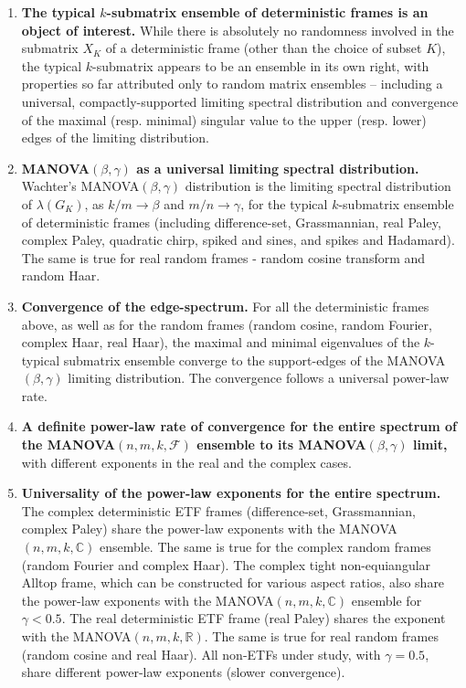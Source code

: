 \documentclass[a4paper,12pt]{article}
\newcommand{\TODO}[1]{ {\tt \color{red} [TODO:#1] } }
\newcommand{\R}{\ensuremath{\mathbb{R}}}
\newcommand{\C}{\ensuremath{\mathbb{C}}}
\newcommand{\Fc}{\ensuremath{\mathcal{F}}}
\newcommand{\m}{m}
\begin{document}
\begin{enumerate}
	\item {\bf The typical $k$-submatrix ensemble of deterministic frames is an
		object of interest.}
		While there is absolutely no randomness involved in the submatrix $X_K$
		of a deterministic frame (other than the choice of subset $K$), 
		the typical $k$-submatrix appears to be an ensemble in its own right,
		with properties so far attributed only to random matrix ensembles --
		including a universal, compactly-supported
		limiting spectral distribution and convergence of the maximal (resp.
		minimal) singular value to the upper (resp. lower) edges of the limiting
		distribution.

	\item {\bf MANOVA$(\beta,\gamma)$ as a universal limiting spectral distribution.}
		Wachter's MANOVA$(\beta,\gamma)$
		distribution is the limiting spectral distribution of $\lambda(G_K)$, as
		$k/m\to\beta$ and $m/n\to\gamma$, 
		for the typical $k$-submatrix ensemble of deterministic frames 
		(including difference-set, Grassmannian, real Paley, complex Paley,
		quadratic chirp, spiked and sines, and spikes and Hadamard).
		The same is true for real random frames - random cosine transform and
		random Haar.

	\item {\bf Convergence of the edge-spectrum.} 
		For all the deterministic frames above, as well as for the random frames 
		(random cosine, random Fourier, complex Haar, real Haar), the 
		maximal and minimal eigenvalues of the $k$-typical submatrix ensemble 
		converge to the support-edges of the MANOVA$(\beta,\gamma)$ limiting 
		distribution. The convergence follows a universal power-law rate.

	\item {\bf A definite power-law rate of convergence for the
			entire spectrum of the MANOVA$(n,m,k,\Fc)$ ensemble to its 
		MANOVA$(\beta,\gamma)$ limit,} with different exponents in the real and
		the complex cases.

	\item {\bf Universality of the power-law exponents for the entire
		spectrum.} The complex deterministic ETF frames 
		(difference-set, Grassmannian,
		complex Paley)  share the power-law exponents with the
		MANOVA$(n,\m,k,\C)$ ensemble. The same is true for
		the complex random frames (random Fourier and
		complex Haar).
        The complex tight non-equiangular Alltop frame, which can be constructed for various aspect ratios, also share the power-law exponents with the
		MANOVA$(n,\m,k,\C)$ ensemble for $\gamma<0.5$.
		The real deterministic ETF frame 
		(real Paley) %
        shares the exponent with the 
		MANOVA$(n,\m,k,\R)$. The same is true for real random frames 
		(random cosine and real Haar).
        All non-ETFs under study, with $\gamma=0.5$, share different power-law exponents (slower convergence).


\end{enumerate}
\end{document}
